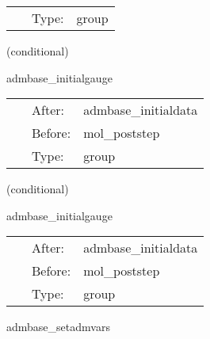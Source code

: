  \begin{tabular*}{160mm}{cll} 
~ & Type:  & group \\ 
\end{tabular*} 


\vspace{5mm}

   (conditional) 

\hspace{5mm} admbase\_initialgauge 

\hspace{5mm}{\it schedule group for the adm initial gauge condition } 


\hspace{5mm}

 \begin{tabular*}{160mm}{cll} 
~ & After:  & admbase\_initialdata \\ 
~ & Before:  & mol\_poststep \\ 
~ & Type:  & group \\ 
\end{tabular*} 


\vspace{5mm}

   (conditional) 

\hspace{5mm} admbase\_initialgauge 

\hspace{5mm}{\it schedule group for the adm initial gauge condition } 


\hspace{5mm}

 \begin{tabular*}{160mm}{cll} 
~ & After:  & admbase\_initialdata \\ 
~ & Before:  & mol\_poststep \\ 
~ & Type:  & group \\ 
\end{tabular*} 


\vspace{5mm}


\hspace{5mm} admbase\_setadmvars 

\hspace{5mm}{\it set the adm variables before this group, and use them afterwards } 


\hspace{5mm}

